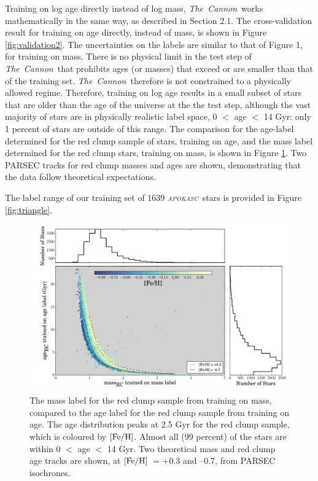 \documentclass[12pt, preprint]{aastex}
\newcommand{\project}[1]{\textsl{#1}}
\newcommand{\tc}{\project{The~Cannon}}
\newcommand{\apokasc}{\project{\textsc{apokasc}}}
\newcommand{\feh}{\mbox{$\rm [Fe/H]$}}
\begin{document}
Training on log age directly instead of log mass,  \tc\ works mathematically in the same way, as described in Section 2.1. The cross-validation result for training on age directly, instead of mass, is shown in Figure \ref{fig:validation2}. The uncertainties on the labels are similar to that of Figure 1, for training on mass. There is no physical limit in the test step of \tc\ that prohibits ages (or masses) that exceed or are smaller than that of the training set. 
\tc\ therefore is not constrained to a physically allowed regime. Therefore, training on log age results in a small subset of stars that are older than the age of the universe at the the test step, although the vast majority of stars are in physically realistic label space, 0 $<$ age $<$ 14 Gyr: only 1 percent of stars are outside of this range.  The comparison for the age-label determined for the red clump sample of stars, training on age, and the mass label determined for the red clump stars, training on mass, is shown in Figure \ref{fig:agemass}. Two PARSEC tracks for red clump masses and ages are shown, demonstrating that the data follow theoretical expectations. 


The label range of our training set of 1639 \apokasc\ stars is provided in Figure \ref{fig:triangle}. 


\begin{figure}[h]
\centering
        \includegraphics[scale=0.4]{./plots/massage_hist2.pdf}
  \caption{The mass label for the red clump sample from training on mass, compared to the age label for the red clump sample from training on age. The age distribution peaks at 2.5 Gyr for the red clump sample, which is coloured by \feh. Almost all (99 percent) of the stars are within 0 $<$ age $<$ 14 Gyr. Two theoretical mass and red clump age tracks are shown, at \feh\ = +0.3 and --0.7, from PARSEC isochrones. }
\label{fig:agemass}
\end{figure}
\end{document}
